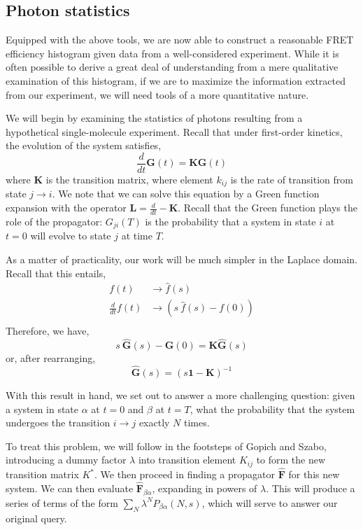 \documentclass{article}
\begin{document}
\subsection{Photon statistics}
Equipped with the above tools, we are now able to construct a
reasonable FRET efficiency histogram given data from a well-considered
experiment. While it is often possible to derive a great deal of
understanding from a mere qualitative examination of this histogram,
if we are to maximize the information extracted from our experiment,
we will need tools of a more quantitative nature.

We will begin by examining the statistics of photons resulting from a
hypothetical single-molecule experiment. Recall that under first-order
kinetics, the evolution of the system satisfies,
\[ \frac{d}{dt} \mathbf{G}(t) = \mathbf{K} \mathbf{G}(t) \]
where $\mathbf{K}$ is the transition matrix, where element $k_{ij}$ is
the rate of transition from state $j \rightarrow i$. We note that we
can solve this equation by a Green function expansion with the
operator $\mathbf{L} = \frac{d}{dt} - \mathbf{K}$. Recall that the
Green function plays the role of the propagator: $G_{ji}(T)$ is the
probability that a system in state $i$ at $t=0$ will evolve to state
$j$ at time $T$.

As a matter of practicality, our work will be much simpler in the
Laplace domain. Recall that this entails,
\begin{align*}
f(t) & \rightarrow \hat f(s) \\
\frac{d}{dt} f(t) & \rightarrow (s~ \hat f(s) - f(0)) \\
\end{align*}
Therefore, we have,
\[ s~\mathbf{\hat G}(s) - \mathbf{G}(0) = \mathbf{K} \mathbf{\hat G}(s) \]
or, after rearranging,
\[ \mathbf{\hat G}(s) = (s \mathbf{1} - \mathbf{K})^{-1} \]

With this result in hand, we set out to answer a more challenging
question: given a system in state $\alpha$ at $t=0$ and $\beta$ at
$t=T$, what the probability that the system undergoes the transition
$i \rightarrow j$ exactly $N$ times.

To treat this problem, we will follow in the footsteps of Gopich and
Szabo\cite{Gopich2003}, introducing a dummy factor $\lambda$ into
transition element $K_{ij}$ to form the new transition matrix $K^*$.
We then proceed in finding a propagator $\mathbf{\hat F}$ for this new
system. We can then evaluate $\mathbf{\hat F}_{\beta\alpha}$,
expanding in powers of $\lambda$. This will produce a series of terms
of the form $\sum_N \lambda^N P_{\beta\alpha}(N, s)$, which will serve
to answer our original query.
\end{document}
